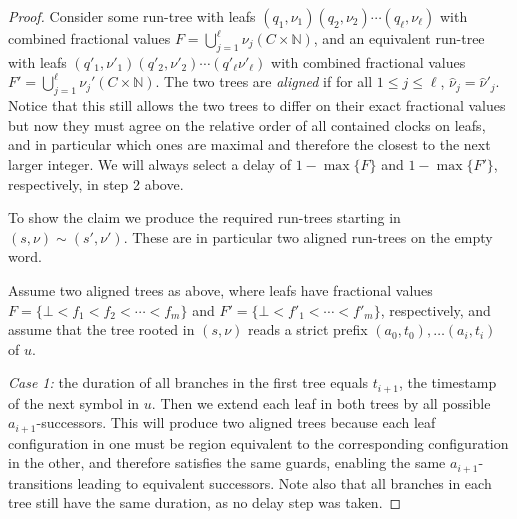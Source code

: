 \documentclass[10pt,a4paper]{amsart}
\theoremstyle{definition}
\numberwithin{equation}{section}
\newcommand{\N}{\mathbb{N}}
\newcommand{\x}{\times}
\newcommand{\clocks}{C}
\newcommand{\req}{\sim}
\begin{document}
\begin{proof}
    Consider some run-tree with leafs
    $(q_1,\nu_1)(q_2,\nu_2)\cdots(q_\ell,\nu_\ell)$
    with combined fractional values $F=\bigcup_{j=1}^\ell\nu_j(\clocks\x\N)$,
    and an equivalent run-tree with leafs
    $(q'_1,\nu'_1)(q'_2,\nu'_2)\cdots(q'_\ell\nu'_\ell)$
    with combined fractional values $F'=\bigcup_{j=1}^\ell\nu_j'(\clocks\x\N)$.
    The two trees are \emph{aligned} if
    for all $1\le j \le \ell$, $\hat{\nu}_j = \hat{\nu}'_j$.
    Notice that this still allows the two trees to differ on their exact fractional values
    but now they must agree on the relative order of all contained clocks on leafs, and in particular which ones are maximal and therefore the closest to the next larger integer.
    We will always select a delay of $1-\max\{F\}$ and $1-\max\{F'\}$, respectively, in step 2 above.

    To show the claim we produce the required run-trees starting in $(s,\nu)\req(s',\nu')$.
    These are in particular two aligned run-trees on the empty word.
    
    Assume two aligned trees as above,
    where leafs have fractional values
    $F=\{\bot<f_1<f_2<\cdots<f_m\}$ and 
    $F'=\{\bot<f'_1<\cdots<f'_m\}$, respectively,
    and assume 
    that the tree rooted in $(s,\nu)$ reads a strict prefix $(a_0,t_0),\ldots (a_i,t_i)$ of $u$.
    
    \smallskip
    \emph{Case 1: } the duration of all branches in the first tree equals $t_{i+1}$, the timestamp of the next symbol in $u$.
    Then we extend each leaf in both trees by all possible $a_{i+1}$-successors.
    This will produce two aligned trees because
    each leaf configuration in one must be region equivalent to the corresponding configuration in the other,
    and therefore satisfies the same guards, enabling the same $a_{i+1}$-transitions leading to equivalent successors. Note also that all branches in each tree still have the same duration, as no delay step was taken.


\end{proof}
\end{document}
